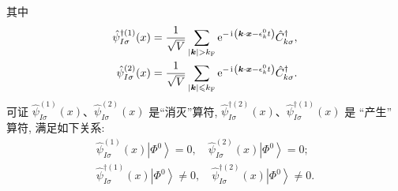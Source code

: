 其中
\begin{align}
\hat{\psi}_{I \sigma}^{\dagger(1)}(x)&=\frac{1}{\sqrt{V}} \sum_{|\vct{k}|>k_{\fun F}} \e^{-\ii\left(\vct{k} \cdot \vct{x}-\epsilon_{k}^{0} t\right)} \hat{C}_{k \sigma}^{\dagger},\nonumber \\
 \hat{\psi}_{I \sigma}^{(2)}(x)&=\frac{1}{\sqrt{V}} \sum_{|\vct{k}| \leqslant k_{\fun F}} \e^{-\ii\left(\vct{k} \cdot \vct{x}-\epsilon_{k}^{0} t\right)} \hat{C}_{k \sigma}^{\dagger}.
\end{align}
可证 $\hat{\psi}_{I \sigma}^{(1)}(x)$、$\hat{\psi}_{I \sigma}^{(2)}(x)$ 是“消灭”算符, $\hat{\psi}_{I \sigma}^{\dagger(2)}(x)$、$\hat{\psi}_{I \sigma}^{\dagger(1)}(x)$ 是 “产生” 算符, 满足如下关系:
\begin{align}
\hat{\psi}_{I \sigma}^{(1)}(x)\left|\Phi^{0}\right\rangle=0, \quad \hat{\psi}_{I \sigma}^{(2)}(x)\left|\Phi^{0}\right\rangle=0;\nonumber \\
\hat{\psi}_{I \sigma}^{\dagger(1)}(x)\left|\Phi^{0}\right\rangle \neq 0, \quad \hat{\psi}_{I \sigma}^{\dagger(2)}(x)\left|\Phi^{0}\right\rangle \neq 0.
\end{align}


